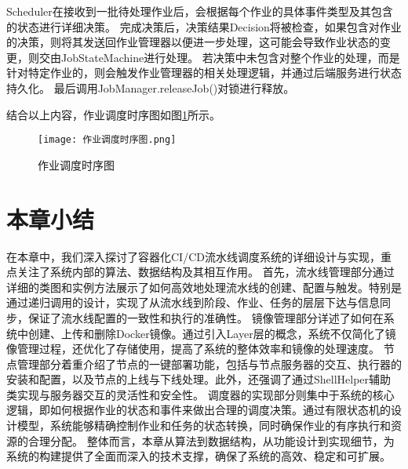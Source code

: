 Scheduler在接收到一批待处理作业后，会根据每个作业的具体事件类型及其包含的状态进行详细决策。
完成决策后，决策结果Decision将被检查，如果包含对作业的决策，则将其发送回作业管理器以便进一步处理，这可能会导致作业状态的变更，则交由JobStateMachine进行处理。
若决策中未包含对整个作业的处理，而是针对特定作业的，则会触发作业管理器的相关处理逻辑，并通过后端服务进行状态持久化。
最后调用JobManager.releaseJob()对锁进行释放。

结合以上内容，作业调度时序图如图\ref{fig:作业调度时序图}所示。

\begin{figure}[h]
  \centering
  \texttt{[image: 作业调度时序图.png]}
  \caption{作业调度时序图}
  \label{fig:作业调度时序图}
\end{figure}

\section{本章小结}
在本章中，我们深入探讨了容器化CI/CD流水线调度系统的详细设计与实现，重点关注了系统内部的算法、数据结构及其相互作用。
首先，流水线管理部分通过详细的类图和实例方法展示了如何高效地处理流水线的创建、配置与触发。特别是通过递归调用的设计，实现了从流水线到阶段、作业、任务的层层下达与信息同步，保证了流水线配置的一致性和执行的准确性。
镜像管理部分详述了如何在系统中创建、上传和删除Docker镜像。通过引入Layer层的概念，系统不仅简化了镜像管理过程，还优化了存储使用，提高了系统的整体效率和镜像的处理速度。
节点管理部分着重介绍了节点的一键部署功能，包括与节点服务器的交互、执行器的安装和配置，以及节点的上线与下线处理。此外，还强调了通过ShellHelper辅助类实现与服务器交互的灵活性和安全性。
调度器的实现部分则集中于系统的核心逻辑，即如何根据作业的状态和事件来做出合理的调度决策。通过有限状态机的设计模型，系统能够精确控制作业和任务的状态转换，同时确保作业的有序执行和资源的合理分配。
整体而言，本章从算法到数据结构，从功能设计到实现细节，为系统的构建提供了全面而深入的技术支撑，确保了系统的高效、稳定和可扩展。